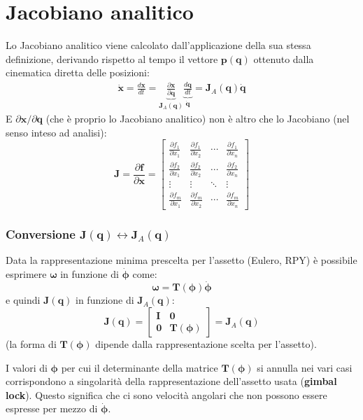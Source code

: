 \section{Jacobiano analitico}
Lo Jacobiano analitico viene calcolato dall’applicazione della sua stessa definizione, derivando rispetto al tempo il vettore $\bm{p}(\bm{q})$ ottenuto dalla cinematica diretta delle posizioni:	
\begin{gather*}
	\dot{\bm{x}}
	=
	\frac{d\bm{x}}{dt}
	=
	\underbrace{\frac{\partial\bm{x}}{\partial \bm{q}}}_{\bm{J}_A(\bm{q})}
	\underbrace{\frac{d\bm{q}}{d t}}_{\dot{\bm{q}}}
	=
	\bm{J}_A(\bm{q})\dot{\bm{q}}
\end{gather*}
E ${\partial\bm{x}} / {\partial \bm{q}}$ (che è proprio lo Jacobiano analitico) non è altro che lo Jacobiano (nel senso inteso ad analisi):
\[
\bm{J} = \frac{\partial \bm{f}}{\partial \bm{x}} =
\begin{bmatrix}
	\frac{\partial f_1}{\partial x_1} & \frac{\partial f_1}{\partial x_2} & \cdots & \frac{\partial f_1}{\partial x_n} \\[7pt]
	\frac{\partial f_2}{\partial x_1} & \frac{\partial f_2}{\partial x_2} & \cdots & \frac{\partial f_2}{\partial x_n} \\[5pt]
	\vdots & \vdots & \ddots & \vdots \\[5pt]
	\frac{\partial f_m}{\partial x_1} & \frac{\partial f_m}{\partial x_2} & \cdots & \frac{\partial f_m}{\partial x_n}
\end{bmatrix}
\]

\vspace*{10pt}
\subsubsection{Conversione $\bm{J}(\bm{q}) \leftrightarrow \bm{J}_A(\bm{q})$}
Data la rappresentazione minima prescelta per l’assetto (Eulero, RPY) è possibile esprimere $\bm{\omega}$ in funzione di $\dot{\bm{\phi}}$ come:
$$
\bm{\omega} = \bm{T}(\bm{\phi})\bm{\dot{\phi}}
$$
e quindi $\bm{J}(\bm{q})$ in funzione di $\bm{J}_A(\bm{q})$:
$$
\bm{J}(\bm{q})
=
\begin{bmatrix*}
\bm{I} & \bm{0} \\
\bm{0} & \bm{T}(\bm{\phi})
\end{bmatrix*}
=
\bm{J}_A(\bm{q})
$$
(la forma di $\bm{T}(\bm{\phi})$ dipende dalla rappresentazione scelta per l'assetto).

I valori di $\bm{\phi}$ per cui il determinante della matrice $\bm{T}(\bm{\phi})$ si annulla nei vari casi corrispondono a singolarità della rappresentazione dell’assetto usata (\textbf{gimbal lock}). Questo significa che ci sono velocità angolari che non possono essere espresse per mezzo di $\dot{\bm{\phi}}$.


